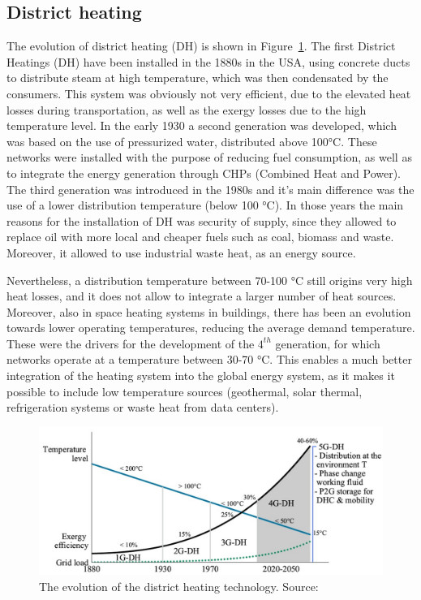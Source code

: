 \documentclass{article}
\begin{document}
\subsection{District heating}
The evolution of district heating (DH) is shown in Figure~\ref{fig:4GDH}.
The first District Heatings (DH) have been installed in the 1880s in the USA, using concrete ducts to distribute steam at high temperature, which was then condensated by the consumers. This system was obviously not very efficient, due to the elevated heat losses during transportation, as well as the exergy losses due to the high temperature level. In the early 1930 a second generation was developed, which was based on the use of pressurized water, distributed above 100\si{\celsius}. These networks were installed with the purpose of reducing fuel consumption, as well as to integrate the energy generation through CHPs (Combined Heat and Power). The third generation was introduced in the 1980s and it's main difference was the use of a lower distribution temperature (below 100 \si{\celsius}). In those years the main reasons for the installation of DH was security of supply, since they allowed to replace oil with more local and cheaper fuels such as coal, biomass and waste. Moreover, it allowed to use industrial waste heat, as an energy source. 

Nevertheless, a distribution temperature between 70-100 \si{\celsius} still origins very high heat losses, and it does not allow to integrate a larger number of heat sources. Moreover, also in space heating systems in buildings, there has been an evolution towards lower operating temperatures, reducing the average demand temperature. These were the drivers for the development of the $4^{th}$ generation, for which networks operate at a temperature between 30-70 \si{\celsius}. This enables a much better integration of the heating system into the global energy system, as it makes it possible to include low temperature sources (geothermal, solar thermal, refrigeration systems or waste heat from data centers).

\begin{figure}[h!]
\centering
\includegraphics[width=1\textwidth]{5GDH.jpg}
\caption{The evolution of the district heating technology. Source:\cite{lucgirardin5thGenerationDHC2018}}
\label{fig:4GDH}
\end{figure}
\end{document}
